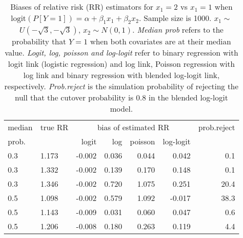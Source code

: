 \documentclass[12pt,a4paper]{article}
\begin{document}
\begin{table}[H] 
\small\sf\centering 
\caption{Biases of relative risk (RR) estimators for $x_1=2$ vs $x_1=1$ when $\mbox{logit}(P[Y=1])=\alpha+\beta_1 x_1 + \beta_2 x_2$. Sample size is 1000. $x_1 \sim $$U(-\sqrt{3},-\sqrt{3})$, $x_2 \sim N(0,1)$. {\it Median prob} refers to the probability that $Y=1$ when both covariates are at their median value. {\it Logit, log, poisson and log-logit} refer to binary regression with logit link (logistic regression) and log link, Poisson regression with log link and binary regression with blended log-logit link, respectively. {\it Prob.reject} is the simulation probability of rejecting the null that the cutover probability is $0.8$ in the blended log-logit model.} 
\begin{tabular}{llrrrrr} 
\toprule 
median & true RR & \multicolumn{4}{c}{bias of estimated RR} & prob.reject \\ 
prob. & & logit & log & poisson & log-logit  & \\ \midrule 
0.3 & 1.173 & -0.002 & 0.036 & 0.044 &  0.042 &  0.1 \\  
0.3 & 1.332 & -0.002 & 0.139 & 0.170 &  0.148 &  0.1 \\  
0.3 & 1.346 & -0.002 & 0.720 & 1.075 &  0.251 & 20.4 \\  
0.5 & 1.098 & -0.002 & 0.579 & 1.092 & -0.017 & 38.3 \\  
0.5 & 1.143 & -0.009 & 0.031 & 0.060 &  0.047 &  0.6 \\  
0.5 & 1.206 & -0.008 & 0.180 & 0.263 &  0.119 &  4.4 \\  
\bottomrule 
\end{tabular} 
\end{table} 
\end{document}
